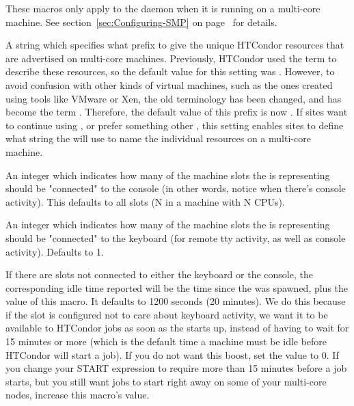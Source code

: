 These macros only apply to the  daemon when it is running on 
a multi-core machine. 
See section~\ref{sec:Configuring-SMP} on
page~\pageref{sec:Configuring-SMP} for details.

\begin{description}

\label{param:StartdResourcePrefix}
\item[\Macro{STARTD\_RESOURCE\_PREFIX}] 
  A string which specifies what prefix to give the unique HTCondor
  resources that are advertised on multi-core machines.
  Previously, HTCondor used the term  to describe
  these resources, so the default value for this setting was .
  However, to avoid confusion with other kinds of virtual machines,
  such as the ones created using tools like VMware or Xen, the old
   terminology has been changed, and has become
  the term .
  Therefore, the default value of this prefix is now .
  If sites want to continue using , or prefer something other
  , this setting enables sites to define what string the
   will use to name the individual resources on a multi-core
  machine.

\label{param:SlotsConnectedToConsole}
\item[\Macro{SLOTS\_CONNECTED\_TO\_CONSOLE}] 
  An integer which indicates how many of the machine slots
  the  is representing should be "connected" to the
  console (in other words, notice when there's console activity).
  This defaults to all slots (N in a machine with N CPUs).

\label{param:SlotsConnectedToKeyboard}
\item[\Macro{SLOTS\_CONNECTED\_TO\_KEYBOARD}]
  An integer which indicates how many of the machine slots
  the  is representing should be "connected" to the
  keyboard (for remote tty activity, as well as console activity).
  Defaults to 1.

\label{param:DisconnectedKeyboardIdleBoost}
\item[\Macro{DISCONNECTED\_KEYBOARD\_IDLE\_BOOST}]
  If there are slots not connected to either the keyboard
  or the console, the corresponding idle time reported will be the
  time since the  was spawned, plus the value of this macro.
  It defaults to 1200 seconds (20 minutes). 
  We do this because if the slot is configured not to care
  about keyboard activity, we want it to be available to HTCondor jobs
  as soon as the  starts up, instead of having to wait for 15
  minutes or more (which is the default time a machine must be idle
  before HTCondor will start a job).
  If you do not want this boost, set the value to 0.  
  If you change your START expression to require more than 15 minutes
  before a job starts, but you still want jobs to start right away on
  some of your multi-core nodes, increase this macro's value.


\end{description}
